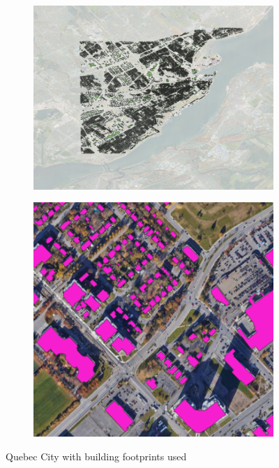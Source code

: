 \documentclass[11pt]{article}
\begin{document}
\begin{figure}[H]
    \centering
    \begin{subfigure}{0.5\textwidth}
        \centering
        \includegraphics[width=\textwidth]{fig1.png}
    \end{subfigure}%
    \hfill
    \begin{subfigure}{0.392\textwidth}
        \centering
        \includegraphics[width=\textwidth]{fig1.2.png}
    \end{subfigure}
    \captionsetup{justification=centering}
    \caption{Quebec City with building footprints used}
    \label{fig:qc}
\end{figure}
\end{document}
